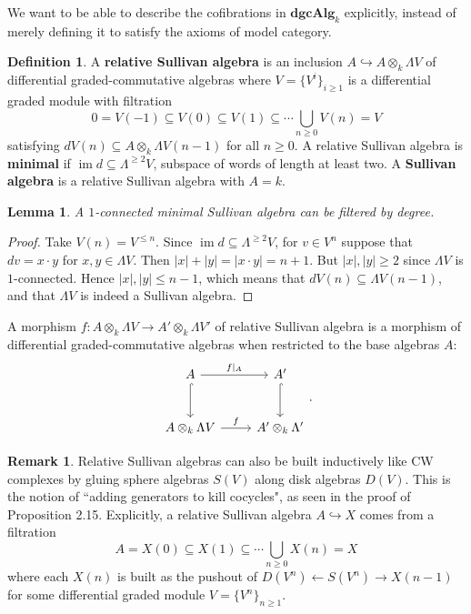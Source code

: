 \documentclass[psamsfonts]{amsart}
\newtheorem{lem}{Lemma}[section]
\theoremstyle{definition}
\newtheorem{defn}{Definition}[section]
\newtheorem{rem}{Remark}[section]
\newcommand{\dgcAlg}{\mathbf{dgcAlg}}
\DeclareMathOperator{\im}{im}
\numberwithin{equation}{section}
\begin{document}
We want to be able to describe the cofibrations in $\dgcAlg_k$ explicitly, instead of merely defining it
to satisfy the axioms of model category.

\begin{defn}
A \textbf{relative Sullivan algebra} is an inclusion $A\hookrightarrow A\otimes_k\Lambda V$ of differential graded-commutative algebras where $V=\{V^i\}_{i\geq1}$ is a differential graded module with filtration
\[0=V(-1)\subseteq V(0)\subseteq V(1)\subseteq\cdots\bigcup_{n\geq0}V(n)=V\]
satisfying $dV(n)\subseteq A\otimes_k\Lambda V(n-1)$ for all $n\geq0$. A relative Sullivan algebra is \textbf{minimal} if $\im d\subseteq\Lambda^{\geq2}V$, subspace of words of length at least two. A \textbf{Sullivan algebra} is a relative Sullivan algebra with $A=k$.
\end{defn}

\begin{lem}
A $1$-connected minimal Sullivan algebra can be filtered by degree.
\end{lem}
\begin{proof}
Take $V(n)=V^{\leq n}$. Since $\im d\subseteq\Lambda^{\geq2}V$, for $v\in V^n$ suppose that $dv=x\cdot y$ for $x,y\in\Lambda V$. Then $|x|+|y|=|x\cdot y|=n+1$. But $|x|,|y|\geq2$ since $\Lambda V$ is $1$-connected. Hence $|x|,|y|\leq n-1$, which means that $dV(n)\subseteq\Lambda V(n-1)$, and that $\Lambda V$ is indeed a Sullivan algebra.
\end{proof}

A morphism $f:A\otimes_k\Lambda V\to A'\otimes_k\Lambda V'$ of relative Sullivan algebra is a morphism of differential graded-commutative algebras when restricted to the base algebras $A$:
\[\begin{tikzcd}[row sep=large]
A\arrow[d,hookrightarrow]\arrow[r,"f|_A"]&A'\arrow[d,hookrightarrow]\\
A\otimes_k\Lambda V\arrow[r,"f"]&A'\otimes_k\Lambda'
\end{tikzcd}.\]

\begin{rem}
Relative Sullivan algebras can also be built inductively like CW complexes by gluing sphere algebras $S(V)$ along disk algebras $D(V)$. This is the notion of ``adding generators to kill cocycles", as seen in the proof of Proposition 2.15. Explicitly, a relative Sullivan algebra $A\hookrightarrow X$ comes from a filtration
\[A=X(0)\subseteq X(1)\subseteq\cdots\bigcup_{n\geq0}X(n)=X\]
where each $X(n)$ is built as the pushout of $D(V^n)\leftarrow S(V^n)\rightarrow X(n-1)$ for some differential graded module $V=\{V^n\}_{n\geq1}$.
\end{rem}
\end{document}
